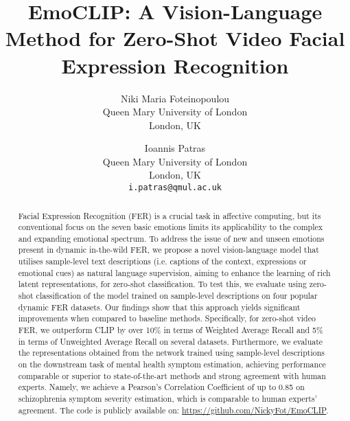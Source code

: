 \documentclass[10pt,twocolumn,letterpaper]{article}
\begin{document}
\title{EmoCLIP: A Vision-Language Method for Zero-Shot Video Facial Expression Recognition}

\author{Niki Maria Foteinopoulou\\
Queen Mary University of London\\
London, UK\\
\and
Ioannis Patras\\
Queen Mary University of London\\
London, UK\\
{\tt\small i.patras@qmul.ac.uk}
}
\maketitle

\begin{abstract}
   Facial Expression Recognition (FER) is a crucial task in affective computing, but its conventional focus on the seven basic emotions limits its applicability to the complex and expanding emotional spectrum. To address the issue of new and unseen emotions present in dynamic in-the-wild FER, we propose a novel vision-language model that utilises sample-level text descriptions (i.e. captions of the context, expressions or emotional cues) as natural language supervision, aiming to enhance the learning of rich latent representations, for zero-shot classification. To test this, we evaluate using zero-shot classification of the model trained on sample-level descriptions on four popular dynamic FER datasets. Our findings show that this approach yields significant improvements when compared to baseline methods. Specifically, for zero-shot video FER, we outperform CLIP by over 10\% in terms of Weighted Average Recall and 5\% in terms of Unweighted Average Recall on several datasets. Furthermore, we evaluate the representations obtained from the network trained using sample-level descriptions on the downstream task of mental health symptom estimation, achieving performance comparable or superior to state-of-the-art methods and strong agreement with human experts. Namely, we achieve a Pearson's Correlation Coefficient of up to 0.85 on schizophrenia symptom severity estimation, which is comparable to human experts' agreement. The code is publicly available on: \href{https://github.com/NickyFot/EmoCLIP}{https://github.com/NickyFot/EmoCLIP}.
\end{abstract}
\end{document}

